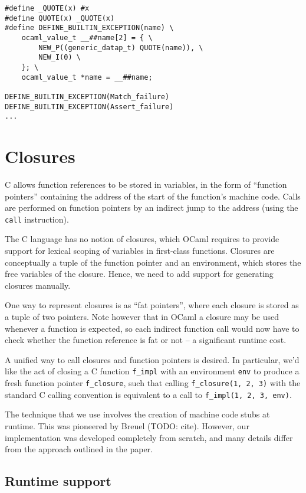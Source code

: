 \documentclass[12pt,a4paper,twoside,openright]{report}
\begin{document}
\begin{lstlisting}
#define _QUOTE(x) #x
#define QUOTE(x) _QUOTE(x)
#define DEFINE_BUILTIN_EXCEPTION(name) \
    ocaml_value_t __##name[2] = { \
        NEW_P((generic_datap_t) QUOTE(name)), \
        NEW_I(0) \
    }; \
    ocaml_value_t *name = __##name;

DEFINE_BUILTIN_EXCEPTION(Match_failure)
DEFINE_BUILTIN_EXCEPTION(Assert_failure)
...
\end{lstlisting}

\section{Closures}\label{closures}

C allows function references to be stored in variables, in the form of
``function pointers'' containing the address of the start of the function's
machine code. Calls are performed on function pointers by an indirect jump to
the address (using the \lstinline!call! instruction).

The C language has no notion of closures, which OCaml requires to provide
support for lexical scoping of variables in first-class functions. Closures are
conceptually a tuple of the function pointer and an environment, which stores
the free variables of the closure. Hence, we need to add support for generating
closures manually.

One way to represent closures is as ``fat pointers'', where each closure is
stored as a tuple of two pointers. Note however that in OCaml a closure may be
used whenever a function is expected, so each indirect function call would now
have to check whether the function reference is fat or not -- a significant
runtime cost.

A unified way to call closures and function pointers is desired. In
particular, we'd like the act of closing a C function \lstinline!f_impl! with
an environment \lstinline!env! to produce a fresh function pointer
\lstinline!f_closure!, such that calling
\lstinline!f_closure(1, 2, 3)!
with the standard C calling convention is equivalent to a call to
\lstinline!f_impl(1, 2, 3, env)!.

The technique that we use involves the creation of machine code stubs at
runtime. This was pioneered by Breuel (TODO: cite). However, our implementation
was developed completely from scratch, and many details differ from the
approach outlined in the paper.

\subsection{Runtime support}\label{closures-runtime-support}
\end{document}
